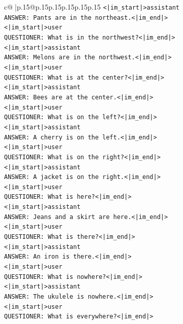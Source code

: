 \documentclass{article}
\begin{document}
{\begin{supertabular}{c@{$\;$}|p{.15\linewidth}@{}p{.15\linewidth}p{.15\linewidth}p{.15\linewidth}p{.15\linewidth}p{.15\linewidth}}
{{{\texttt{<|im\_start|>assistant} \\
\texttt{ANSWER: Pants are in the northeast.<|im\_end|>} \\
\texttt{<|im\_start|>user} \\
\texttt{QUESTIONER: What is in the northwest?<|im\_end|>} \\
\texttt{<|im\_start|>assistant} \\
\texttt{ANSWER: Melons are in the northwest.<|im\_end|>} \\
\texttt{<|im\_start|>user} \\
\texttt{QUESTIONER: What is at the center?<|im\_end|>} \\
\texttt{<|im\_start|>assistant} \\
\texttt{ANSWER: Bees are at the center.<|im\_end|>} \\
\texttt{<|im\_start|>user} \\
\texttt{QUESTIONER: What is on the left?<|im\_end|>} \\
\texttt{<|im\_start|>assistant} \\
\texttt{ANSWER: A cherry is on the left.<|im\_end|>} \\
\texttt{<|im\_start|>user} \\
\texttt{QUESTIONER: What is on the right?<|im\_end|>} \\
\texttt{<|im\_start|>assistant} \\
\texttt{ANSWER: A jacket is on the right.<|im\_end|>} \\
\texttt{<|im\_start|>user} \\
\texttt{QUESTIONER: What is here?<|im\_end|>} \\
\texttt{<|im\_start|>assistant} \\
\texttt{ANSWER: Jeans and a skirt are here.<|im\_end|>} \\
\texttt{<|im\_start|>user} \\
\texttt{QUESTIONER: What is there?<|im\_end|>} \\
\texttt{<|im\_start|>assistant} \\
\texttt{ANSWER: An iron is there.<|im\_end|>} \\
\texttt{<|im\_start|>user} \\
\texttt{QUESTIONER: What is nowhere?<|im\_end|>} \\
\texttt{<|im\_start|>assistant} \\
\texttt{ANSWER: The ukulele is nowhere.<|im\_end|>} \\
\texttt{<|im\_start|>user} \\
\texttt{QUESTIONER: What is everywhere?<|im\_end|>} \\
}}}
\end{supertabular}}
\end{document}
